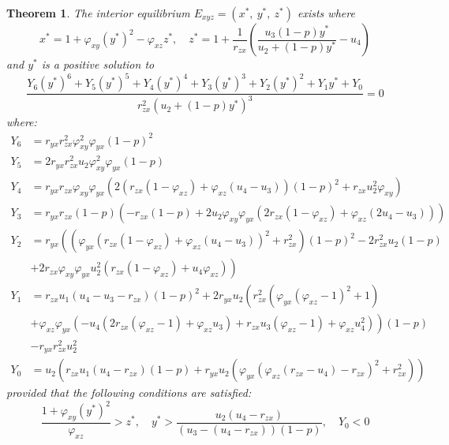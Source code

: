 \documentclass[]{interact}
\theoremstyle{plain}%
\newtheorem{theorem}{Theorem}[section]
\theoremstyle{definition}
\theoremstyle{remark}
\numberwithin{equation}{section}
\begin{document}
\begin{theorem}\label{thm:interior-exist}
    The interior equilibrium $E_{xyz}=\left(x^*,\ y^*,\ z^*\right)$ exists where
    \begin{equation*}
        x^*=1+\varphi_{xy}\left(y^*\right)^2-\varphi_{xz}z^*,\quad 
        z^*=1+\frac{1}{r_{zx}}\left(\frac{u_3\left(1-p\right)y^*}{u_2+\left(1-p\right)y^*}-u_4\right)
    \end{equation*}
    and $y^*$ is a positive solution to 
    \begin{equation}\label{eq:interior-Y}
        \frac{Y_6\left(y^*\right)^6+Y_5\left(y^*\right)^5+Y_4\left(y^*\right)^4+Y_3\left(y^*\right)^3+Y_2\left(y^*\right)^2+Y_1y^*+Y_0}{r_{zx}^2\left(u_2+\left(1-p\right)y^*\right)^3}=0
    \end{equation}
    where:
    \begin{align*}
        Y_6 &= r_{yx}r_{zx}^2\varphi_{xy}^2\varphi_{yx}\left(1-p\right)^2\\
        Y_5 &= 2r_{yx}r_{zx}^2u_2\varphi_{xy}^2\varphi_{yx}\left(1-p\right)\\
        Y_4 &= r_{yx}r_{zx}\varphi_{xy}\varphi_{yx}\left(2\left(r_{zx}\left(1-\varphi_{xz}\right)+\varphi_{xz}\left(u_4-u_3\right)\right)\left(1-p\right)^2+r_{zx}u_2^2\varphi_{xy}\right)\\
        Y_3 &= r_{yx}r_{zx}\left(1-p\right)\left(-r_{zx}\left(1-p\right)+2u_2\varphi_{xy}\varphi_{yx}\left(2r_{zx}\left(1-\varphi_{xz}\right)+\varphi_{xz}\left(2u_4-u_3\right)\right)\right)\\
        Y_2 &= r_{yx}\left(\left(\varphi_{yx}\left(r_{zx}\left(1-\varphi_{xz}\right)+\varphi_{xz}\left(u_4-u_3\right)\right)^2+r_{zx}^2\right)\left(1-p\right)^2-2r_{zx}^2u_2\left(1-p\right)\right.\\
        &\left.+2r_{zx}\varphi_{xy}\varphi_{yx}u_2^2\left(r_{zx}\left(1-\varphi_{xz}\right)+u_4\varphi_{xz}\right)\right)\\
        Y_1 &= r_{zx}u_1\left(u_4-u_3-r_{zx}\right)\left(1-p\right)^2+2r_{yx}u_2\left(r_{zx}^2\left(\varphi_{yx}\left(\varphi_{xz}-1\right)^2+1\right)\right.\\
        &\left.+\varphi_{xz}\varphi_{yx}\left(-u_4\left(2r_{zx}\left(\varphi_{xz}-1\right)+\varphi_{xz}u_3\right)+r_{zx}u_3\left(\varphi_{xz}-1\right)+\varphi_{xz}u_4^2\right)\right)\left(1-p\right)\\
        &-r_{yx}r_{zx}^2u_2^2\\
        Y_0 &= u_2\left(r_{zx}u_1\left(u_4-r_{zx}\right)\left(1-p\right)+r_{yx}u_2\left(\varphi_{yx}\left(\varphi_{xz}\left(r_{zx}-u_4\right)-r_{zx}\right)^2+r_{zx}^2\right)\right)
    \end{align*}
    provided that the following conditions are satisfied:
    \begin{equation*}
        \frac{1+\varphi_{xy}\left(y^*\right)^2}{\varphi_{xz}}>z^*,\quad
        y^*>\frac{u_2\left(u_4-r_{zx}\right)}{\left(u_3-\left(u_4-r_{zx}\right)\right)\left(1-p\right)},\quad
        Y_0 < 0
    \end{equation*}
\end{theorem}
\end{document}

